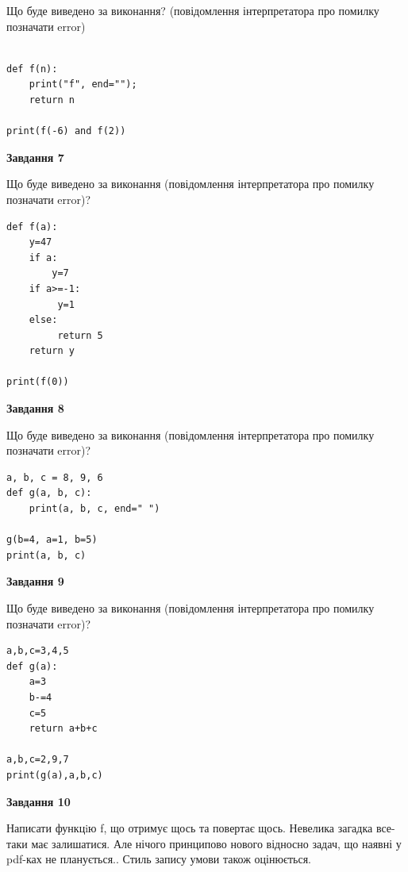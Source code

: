 \documentclass[12pt, ukrainian]{article}
\begin{document}
{\begin {large}
Що буде виведено за виконання? (повідомлення інтерпретатора про помилку позначати error)\par
\begin{verbatim}

def f(n):
    print("f", end="");
    return n

print(f(-6) and f(2))
\end{verbatim}

{\begin {center}\textbf{Завдання 7}\end {center}}

Що буде виведено за виконання (повідомлення інтерпретатора про помилку позначати error)?\par
\begin{verbatim}
def f(a):
    y=47
    if a: 
        y=7
    if a>=-1:
         y=1
    else:
         return 5
    return y

print(f(0))
\end{verbatim}

{\begin {center}\textbf{Завдання 8}\end {center}}

Що буде виведено за виконання (повідомлення інтерпретатора про помилку позначати error)?\par
\begin{verbatim}
a, b, c = 8, 9, 6
def g(a, b, c):
    print(a, b, c, end=" ")

g(b=4, a=1, b=5)
print(a, b, c)
\end{verbatim}

{\begin {center}\textbf{Завдання 9}\end {center}}

Що буде виведено за виконання (повідомлення інтерпретатора про помилку позначати error)?\par
\begin{verbatim}
a,b,c=3,4,5
def g(a):
    a=3
    b-=4
    c=5
    return a+b+c

a,b,c=2,9,7
print(g(a),a,b,c)
\end{verbatim}

{\begin {center}\textbf{Завдання 10}\end {center}}


Написати функцiю f, що отримує щось та повертає щось. Невелика загадка все-таки має залишатися. Але нічого принципово нового відносно задач, що наявні у pdf-ках не планується.. Стиль запису умови також оцінюється.\par
\end {large}}
\newpage
\end{document}
